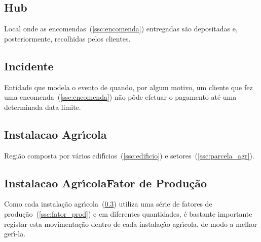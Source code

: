 \documentclass[12pt, a4paper]{article}
\begin{document}

\subsection{Hub}\label{ssc:hub}

Local onde as encomendas~(\ref{ssc:encomenda}) entregadas s\~ao depositadas e,
posteriormente, recolhidas pelos clientes.



\subsection{Incidente}\label{ssc:incidente}

Entidade que modela o evento de quando, por algum motivo,
um cliente que fez uma encomenda~(\ref{ssc:encomenda})
n\~ao p\^ode efetuar o pagamento até uma determinada data limite.



\subsection{Instalacao Agr\'{\i}cola}\label{ssc:inst_agr}

Regi\~ao composta por v\'arios edif\'{\i}cios~(\ref{ssc:edificio}) e setores~(\ref{ssc:parcela_agr}).


\subsection{Instalacao Agr\'{\i}cola{\textendash}Fator de Produ\c{c}\~ao}\label{ssc:inst_agr_fat_prod}

Como cada instala\c{c}\~ao agr\'{\i}cola~(\ref{ssc:inst_agr}) utiliza uma s\'erie de
fatores de produ\c{c}\~ao~(\ref{ssc:fator_prod}) e em diferentes quantidades, \'e
bastante importante registar esta movimenta\c{c}\~ao dentro de cada instala\c{c}\~ao
agr\'{\i}cola, de modo a melhor ger\'{\i}-la.
\end{document}
